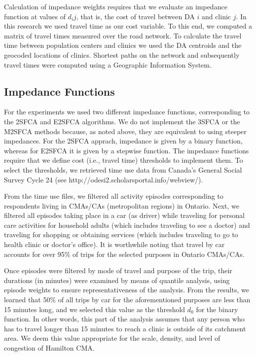 \documentclass[10pt,letterpaper]{article}
\begin{document}
Calculation of impedance weights requires that we evaluate an impedance
function at values of \(d_ij\), that is, the cost of travel between DA
\(i\) and clinic \(j\). In this research we used travel time as our cost
variable. To this end, we computed a matrix of travel times measured
over the road network. To calculate the travel time between population
centers and clinics we used the DA centroids and the geocoded locations
of clinics. Shortest paths on the network and subsequently travel times
were computed using a Geographic Information System.

\subsection{Impedance Functions}\label{impedance-functions}

For the experiments we used two different impedance functions,
corresponding to the 2SFCA and E2SFCA algorithms. We do not implement
the 3SFCA or the M2SFCA methods because, as noted above, they are
equivalent to using steeper impedances. For the 2SFCA apprach, impedance
is given by a binary function, whereas for E2SFCA it is given by a
stepwise function. The impedance functions require that we define cost
(i.e., travel time) thresholds to implement them. To select the
thresholds, we retrieved time use data from Canada's General Social
Survey Cycle 24 (see http://odesi2.scholarsportal.info/webview/).

From the time use files, we filtered all activity episodes corresponding
to respondents living in CMAs/CAs (metropolitan regions) in Ontario.
Next, we filtered all episodes taking place in a car (as driver) while
traveling for personal care activities for household adults (which
includes traveling to see a doctor) and traveling for shopping or
obtaining services (which includes traveling to go to health clinic or
doctor's office). It is worthwhile noting that travel by car accounts
for over 95\% of trips for the selected purposes in Ontario CMAs/CAs.

Once episodes were filtered by mode of travel and purpose of the trip,
their durations (in minutes) were examined by means of quantile
analysis, using episode weights to ensure representativeness of the
analysis. From the results, we learned that 50\% of all trips by car for
the aforementioned purposes are less than 15 minutes long, and we
selected this value as the threshold \(d_0\) for the binary function. In
other words, this part of the analysis assumes that any person who has
to travel longer than 15 minutes to reach a clinic is outside of its
catchment area. We deem this value appropriate for the scale, density,
and level of congestion of Hamilton CMA.
\end{document}
